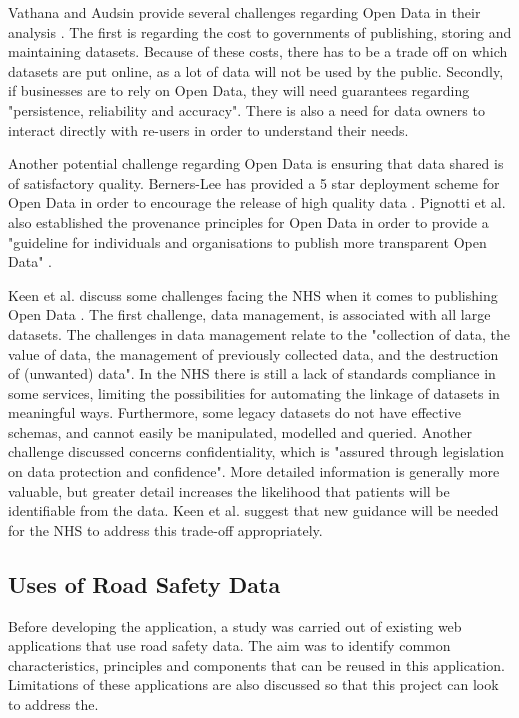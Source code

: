 \documentclass[authoryearcitations]{UoYCSproject}
\begin{document}
Vathana and Audsin provide several challenges regarding Open Data in their analysis \citep{Vathana}. The first is regarding the cost to governments of publishing, storing and maintaining datasets. Because of these costs, there has to be a trade off on which datasets are put online, as a lot of data will not be used by the public. Secondly, if businesses are to rely on Open Data, they will need guarantees regarding "persistence, reliability and accuracy". There is also a need for data owners to interact directly with re-users in order to understand their needs.

Another potential challenge regarding Open Data is ensuring that data shared is of satisfactory quality. Berners-Lee has provided a 5 star deployment scheme for Open Data in order to encourage the release of high quality data \citep{Berners-Lee2006}. Pignotti et al. also established the provenance principles for Open Data in order to provide a "guideline for individuals and organisations to publish more transparent Open Data" \citep{Pignotti2011}.

Keen et al. discuss some challenges facing the NHS when it comes to publishing Open Data \citep{Keen2013}. The first challenge, data management, is associated with all large datasets. The challenges in data management relate to the "collection of data, the value of data, the management of previously collected data, and the destruction of (unwanted) data". In the NHS there is still a lack of standards compliance in some services, limiting the possibilities for automating the linkage of datasets in meaningful ways. Furthermore, some legacy datasets do not have effective schemas, and cannot easily be manipulated, modelled and queried. Another challenge discussed concerns confidentiality, which is "assured through legislation on data protection and confidence".  More detailed information is generally more valuable, but greater detail increases the likelihood that patients will be identifiable from the data. Keen et al. suggest that new guidance will be needed for the NHS to address this trade-off appropriately.

\subsection{Uses of Road Safety Data}

Before developing the application, a study was carried out of existing web applications that use road safety data. The aim was to identify common characteristics, principles and components that can be reused in this application. Limitations of these applications are also discussed so that this project can look to address the.
\end{document}
